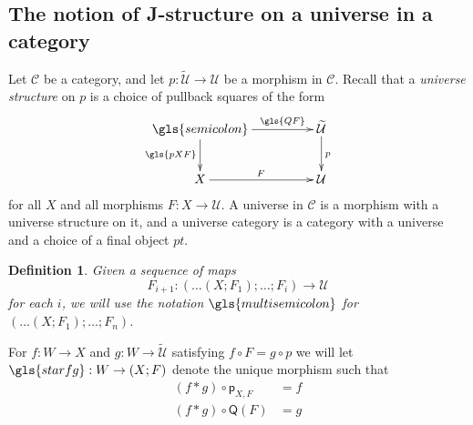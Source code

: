 \documentclass[12pt]{article}
\numberwithin{equation}{section}
\newtheorem{definition}[proposition]{Definition}
\newcommand{\sr}{\rightarrow}
\newcommand{\wt}{\widetilde}
\newcommand{\C}{{\mathcal C}}  %
\newcommand{\p}{\mathsf{p}}
\newcommand{\U}{\mathcal{U}}
\newcommand{\Q}{\mathsf{Q}}
\begin{document}
\subsection{The notion of J-structure on a universe in a category}
%
Let $\C$ be a category,
and let $p:\wt{\U}\sr \U$ be a morphism in
$\C$. Recall \cite{Cfromauniverse} that a {\em universe structure} on $p$ is a choice of pullback
squares of the form
%
$$
\begin{xy}
          \xymatrix@C=4pc{ \gls{semicolon} \ar[r]^-{\gls{QF}} \ar[d]_{\gls{pXF}} & \wt{\U}
            \ar[d]^{p}\\ X \ar[r]^{F} & \U }
\end{xy}
$$
%
for all $X$ and all morphisms $F:X\sr \U$. A universe in $\C$ is a
morphism with a universe structure on it, and a universe category is a category
with a universe and a choice of a final object $pt$.

\begin{definition}\label{iter-univ-str}
  Given a sequence of maps $$F_{i+1} : (\dots(X;F_1);\dots;F_i) \to \U$$ for each $i$,
  we will use the notation $\gls{multisemicolon}$ for $(\dots(X;F_1);\dots;F_n)$.
\end{definition}

For $f:W\sr X$ and $g:W\sr \wt{\U}$ satisfying $f\circ F = g \circ p$ we will let $\gls{starfg} : W \sr (X;F)$ denote the unique morphism
such that
%
\begin{align}
  (f*g)\circ \p_{X,F} & =f \label{star-eq1} \\
  (f*g)\circ \Q(F) & =g \label{star-eq2}
\end{align}
\end{document}

